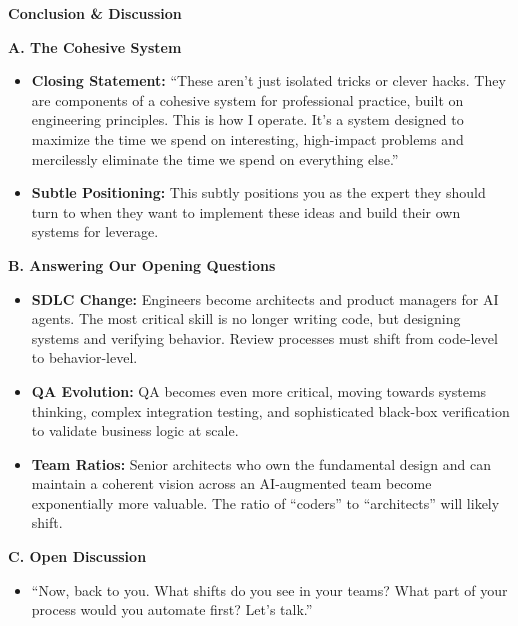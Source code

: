 \documentclass[
  ignorenonframetext,
  aspectratio=169,
]{beamer}
\providecommand{\tightlist}{%
  \setlength{\itemsep}{0pt}\setlength{\parskip}{0pt}}
\begin{document}
\begin{frame}{\textbf{Conclusion \& Discussion}}
\label{conclusion-discussion}
\begin{block}{\textbf{A. The Cohesive System}}
\label{a.-the-cohesive-system}
\begin{itemize}
\tightlist
\item
  \textbf{Closing Statement:} ``These aren't just isolated tricks or
  clever hacks. They are components of a cohesive system for
  professional practice, built on engineering principles. This is how I
  operate. It's a system designed to maximize the time we spend on
  interesting, high-impact problems and mercilessly eliminate the time
  we spend on everything else.''\\
\item
  \textbf{Subtle Positioning:} This subtly positions you as the expert
  they should turn to when they want to implement these ideas and build
  their own systems for leverage.
\end{itemize}
\end{block}

\begin{block}{\textbf{B. Answering Our Opening Questions}}
\label{b.-answering-our-opening-questions}
\begin{itemize}
\tightlist
\item
  \textbf{SDLC Change:} Engineers become architects and product managers
  for AI agents. The most critical skill is no longer writing code, but
  designing systems and verifying behavior. Review processes must shift
  from code-level to behavior-level.\\
\item
  \textbf{QA Evolution:} QA becomes even more critical, moving towards
  systems thinking, complex integration testing, and sophisticated
  black-box verification to validate business logic at scale.\\
\item
  \textbf{Team Ratios:} Senior architects who own the fundamental design
  and can maintain a coherent vision across an AI-augmented team become
  exponentially more valuable. The ratio of ``coders'' to ``architects''
  will likely shift.
\end{itemize}
\end{block}

\begin{block}{\textbf{C. Open Discussion}}
\label{c.-open-discussion}
\begin{itemize}
\tightlist
\item
  ``Now, back to you. What shifts do you see in your teams? What part of
  your process would you automate first? Let's talk.''
\end{itemize}
\end{block}


\end{frame}
\end{document}

